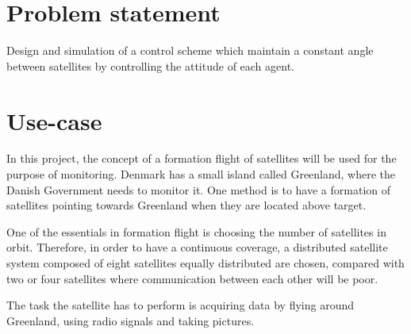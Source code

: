\section{Problem statement}
Design and simulation of a control scheme which maintain a constant angle between satellites by controlling the attitude of each agent.
\section{Use-case}\label{sec:useCase}
In this project, the concept of a formation flight of satellites will be used for the purpose of monitoring. Denmark has a small island called Greenland, where the Danish Government needs to monitor it. One method is to have a formation of satellites pointing towards Greenland when they are located above target.

One of the essentials in formation flight is choosing the number of satellites in orbit. Therefore, in order to have a continuous coverage, a distributed satellite system composed of eight satellites equally distributed are chosen, compared with two or four satellites where communication between each other will be poor.

The task the satellite has to perform is acquiring data by flying around Greenland, using radio signals and taking pictures.

